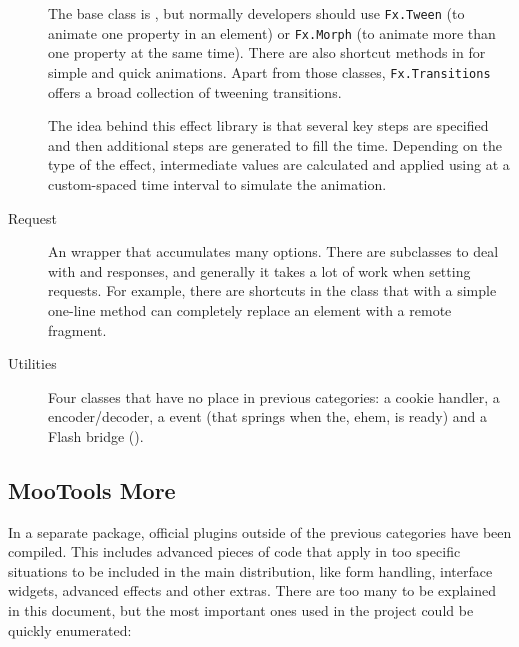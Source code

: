 \begin{description}
  The base class is , but normally developers should use \texttt{Fx.Tween} (to animate one property in an element) or \texttt{Fx.Morph} (to animate more than one property at the same time).
  There are also shortcut methods in  for simple and quick animations.
  Apart from those classes, \texttt{Fx.Transitions} offers a broad collection of tweening transitions.
  
  The idea behind this effect library is that several key steps are specified and then additional steps are generated to fill the time.
  Depending on the type of the effect, intermediate values are calculated and applied using  at a custom-spaced time interval to simulate the animation.
  \item[Request] An  wrapper that accumulates many options.
  There are subclasses to deal with  and  responses, and generally it takes a lot of work when setting  requests.
  For example, there are shortcuts in the  class that with a simple one-line method can completely replace an element with a remote fragment.
  \item[Utilities] Four classes that have no place in previous categories: a cookie handler, a  encoder/decoder, a  event (that springs when the, ehem,  is ready) and a Flash bridge ().
\end{description}


\subsection{MooTools More} %
\label{sub:mootools_more}

In a separate package, official plugins outside of the previous categories have been compiled.
This includes advanced pieces of code that apply in too specific situations to be included in the main distribution, like form handling, interface widgets, advanced effects and other extras.
There are too many to be explained in this document, but the most important ones used in the project could be quickly enumerated:

